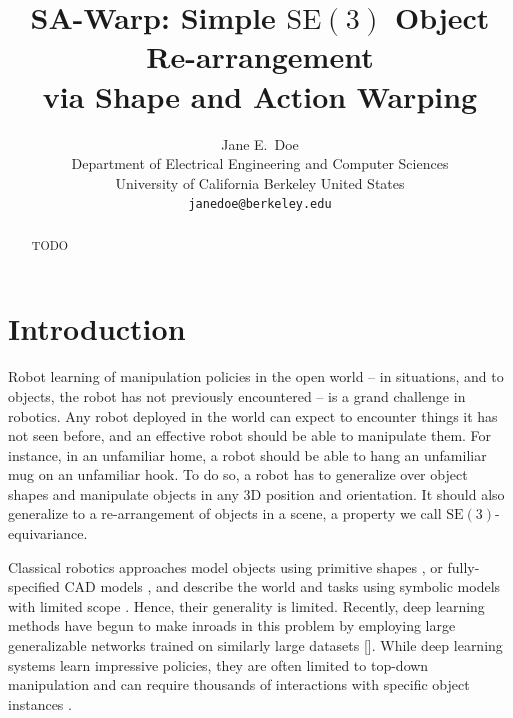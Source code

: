 \documentclass{article}
\title{SA-Warp: Simple $\mathrm{SE}(3)$ Object Re-arrangement \\via Shape and Action Warping}
\author{
  Jane E.~Doe\\
  Department of Electrical Engineering and Computer Sciences\\
  University of California Berkeley 
  United States\\
  \texttt{janedoe@berkeley.edu} \\
}
\begin{document}
\maketitle


\begin{abstract}
TODO
\end{abstract}



\section{Introduction}

Robot learning of manipulation policies in the open world -- in situations, and to objects, the robot has not previously encountered -- is a grand challenge in robotics. Any robot deployed in the world can expect to encounter things it has not seen before, and an effective robot should be able to manipulate them. For instance, in an unfamiliar home, a robot should be able to hang an unfamiliar mug on an unfamiliar hook. To do so, a robot has to generalize over object shapes and manipulate objects in any 3D position and orientation. It should also generalize to a re-arrangement of objects in a scene, a property we call $\mathrm{SE}(3)$-equivariance.

Classical robotics approaches model objects using primitive shapes \citep{miller03Automatic,tenorth13Decomposing}, or fully-specified CAD models \citep{klank09Realtime,beetz11Robotic}, and describe the world and tasks using symbolic models with limited scope \citep{kaelbling11Hierarchical,bartels13Constraintbased}. Hence, their generality is limited. Recently, deep learning methods have begun to make inroads in this problem by employing large generalizable networks trained on similarly large datasets []. While deep learning systems learn impressive policies, they are often limited to top-down manipulation \citep{levine18Learning,zhu22Sample} and can require thousands of interactions with specific object instances \citep{yu19MetaWorld,wang22MathrmSO}.%
\end{document}
